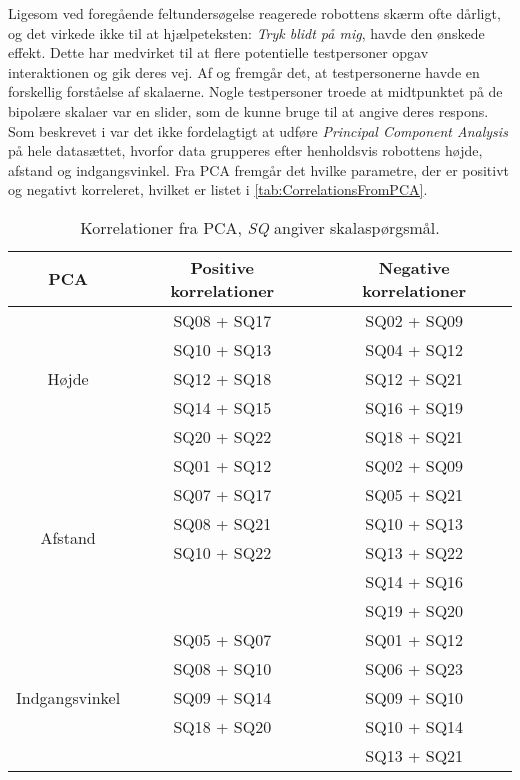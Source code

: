 Ligesom ved foregående feltundersøgelse reagerede robottens skærm ofte dårligt, og det virkede ikke til at hjælpeteksten: \textit{Tryk blidt på mig}, havde den ønskede effekt. Dette har medvirket til at flere potentielle testpersoner opgav interaktionen og gik deres vej.\blankline
%
Af  og  fremgår det, at testpersonerne havde en forskellig forståelse af skalaerne. Nogle testpersoner troede at midtpunktet på de bipolære skalaer var en slider, som de kunne bruge til at angive deres respons. \blankline 
%
Som beskrevet i  var det ikke fordelagtigt at udføre \textit{Principal Component Analysis} på hele datasættet, hvorfor data grupperes efter henholdsvis robottens højde, afstand og indgangsvinkel. Fra PCA fremgår det hvilke parametre, der er positivt og negativt korreleret, hvilket er listet i \autoref{tab:CorrelationsFromPCA}. 
%
\begin{table}[H]
	\centering
	\begin{tabular}{ c|c|c }
		\centering
		PCA & Positive korrelationer & Negative korrelationer \\ \hline
		\multirow{5}{*}{Højde} & SQ08  + SQ17 & SQ02  + SQ09 \\
		& SQ10 + SQ13 & SQ04 + SQ12 \\
		& SQ12 + SQ18 & SQ12 + SQ21 \\
		& SQ14 + SQ15 & SQ16 + SQ19 \\
		& SQ20 + SQ22 & SQ18 + SQ21\\ \hline
		\multirow{6}{*}{Afstand} & SQ01 + SQ12 & SQ02 + SQ09 \\
		& SQ07 + SQ17 & SQ05 + SQ21 \\
		& SQ08 + SQ21 & SQ10 + SQ13 \\
		& SQ10 + SQ22 & SQ13 + SQ22 \\
		&  & SQ14 + SQ16 \\	
		&  & SQ19 + SQ20 \\ \hline	
		\multirow{5}{*}{Indgangsvinkel} 
		& SQ05 + SQ07 & SQ01 + SQ12 \\
		& SQ08 + SQ10 & SQ06 + SQ23 \\
		& SQ09 + SQ14 & SQ09 + SQ10 \\
		& SQ18 + SQ20 & SQ10 + SQ14 \\
		&  & SQ13 + SQ21
	\end{tabular}        
\caption{Korrelationer fra PCA, \textit{SQ} angiver skalaspørgsmål.}
\label{tab:CorrelationsFromPCA}
\end{table}
\noindent
